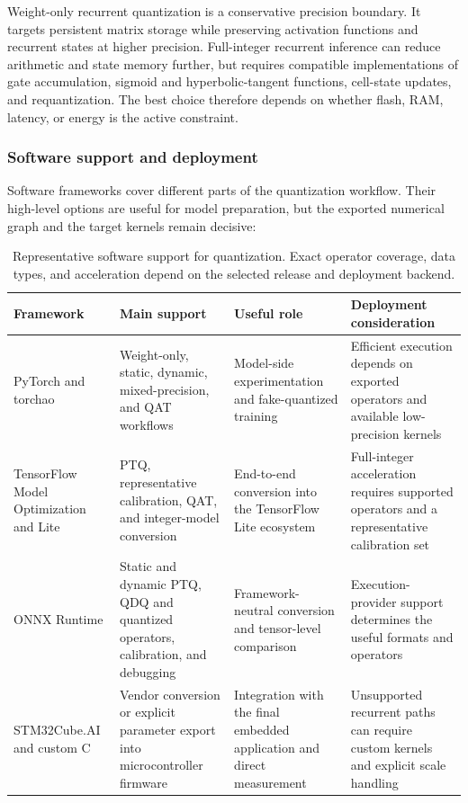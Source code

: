 \documentclass[
    a4paper,
    12pt,
    titlepage,
    bibliography=totoc,
    twoside=on,
    parskip=false,
    numbers=noenddot,
    cleardoublepage=empty,
    DIV=12,
    BCOR=12.0mm,
    headheight=36pt,
    headings=openright
]{scrreprt}
\begin{document}
Weight-only recurrent quantization is a conservative precision boundary. It targets persistent matrix storage while preserving activation functions and recurrent states at higher precision. Full-integer recurrent inference can reduce arithmetic and state memory further, but requires compatible implementations of gate accumulation, sigmoid and hyperbolic-tangent functions, cell-state updates, and requantization. The best choice therefore depends on whether flash, RAM, latency, or energy is the active constraint.

\subsubsection{Software support and deployment}

Software frameworks cover different parts of the quantization workflow. Their high-level options are useful for model preparation, but the exported numerical graph and the target kernels remain decisive:

\begin{table}[htbp]
    \centering
    \small
    \caption[Representative software support for neural-network quantization.]{Representative software support for quantization. Exact operator coverage, data types, and acceleration depend on the selected release and deployment backend.}
    \label{tab:fundamental_quantization_frameworks}
    \begin{tabularx}{\textwidth}{>{\raggedright\arraybackslash}p{3.0cm}>{\raggedright\arraybackslash}p{3.5cm}YY}
        \toprule
        Framework & Main support & Useful role & Deployment consideration \\
        \midrule
        PyTorch and torchao & Weight-only, static, dynamic, mixed-precision, and QAT workflows & Model-side experimentation and fake-quantized training & Efficient execution depends on exported operators and available low-precision kernels \\
        TensorFlow Model Optimization and Lite & PTQ, representative calibration, QAT, and integer-model conversion & End-to-end conversion into the TensorFlow Lite ecosystem & Full-integer acceleration requires supported operators and a representative calibration set \\
        ONNX Runtime & Static and dynamic PTQ, QDQ and quantized operators, calibration, and debugging & Framework-neutral conversion and tensor-level comparison & Execution-provider support determines the useful formats and operators \\
        STM32Cube.AI and custom C & Vendor conversion or explicit parameter export into microcontroller firmware & Integration with the final embedded application and direct measurement & Unsupported recurrent paths can require custom kernels and explicit scale handling \\
        \bottomrule
    \end{tabularx}
\end{table}
\end{document}
